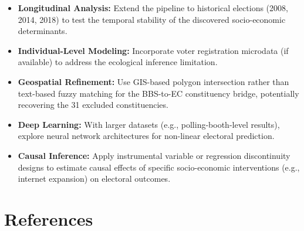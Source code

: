 \documentclass[12pt, a4paper]{article}
\begin{document}
\begin{itemize}
    \item \textbf{Longitudinal Analysis:} Extend the pipeline to historical elections (2008, 2014, 2018) to test the temporal stability of the discovered socio-economic determinants.
    \item \textbf{Individual-Level Modeling:} Incorporate voter registration microdata (if available) to address the ecological inference limitation.
    \item \textbf{Geospatial Refinement:} Use GIS-based polygon intersection rather than text-based fuzzy matching for the BBS-to-EC constituency bridge, potentially recovering the 31 excluded constituencies.
    \item \textbf{Deep Learning:} With larger datasets (e.g., polling-booth-level results), explore neural network architectures for non-linear electoral prediction.
    \item \textbf{Causal Inference:} Apply instrumental variable or regression discontinuity designs to estimate causal effects of specific socio-economic interventions (e.g., internet expansion) on electoral outcomes.
\end{itemize}

\section*{References}
\end{document}
